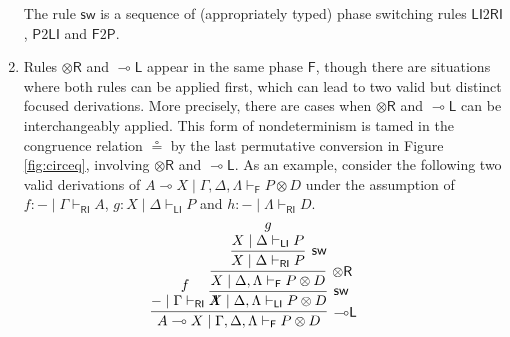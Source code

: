 \documentclass[submission,copyright,creativecommons]{eptcs}
\theoremstyle{definition}
\newcommand{\tr}{\otimes \mathsf{R}}
\newcommand{\lleft}{{\multimap}\mathsf{L}}
\newcommand{\ot}{\otimes}
\newcommand{\lolli}{\multimap}
\newcommand{\RI}{\mathsf{RI}}
\newcommand{\LI}{\mathsf{LI}}
\newcommand{\Pass}{\mathsf{P}}
\newcommand{\F}{\mathsf{F}}
\newcommand{\proofbox}[1]{\begin{tabular}{l} #1 \end{tabular}}
\begin{document}
\begin{enumerate}
\begin{equation}
{{{      }
    }
    }
  \end{equation}
  The rule $\mathsf{sw}$ is a sequence of (appropriately typed) phase
  switching rules $\LI2\RI$, $\Pass2\LI$ and $\F2\Pass$.
  \item Rules $\tr$ and $\lleft$ appear in the same phase $\F$, though there are situations where both rules can be applied first, which can lead to two valid but distinct focused derivations. More precisely, there are cases when $\tr$ and $\lleft$ can be interchangeably applied. This form of nondeterminism is tamed in the congruence relation $\circeq$ by the last permutative conversion in Figure \ref{fig:circeq}, involving $\tr$ and $\lleft$. As an example, consider the following two valid derivations of $A \lolli X \mid \Gamma , \Delta , \Lambda \vdash_{\F} P \ot D$ under the assumption of $f : - \mid \Gamma \vdash_{\RI} A$, $g : X \mid \Delta \vdash_{\LI} P$ and $h : - \mid \Lambda \vdash_{\RI} D$.
    \begin{equation}\label{eq:llefttr}
      \hspace{-.5cm}
      \proofbox{
      \infer[\lleft]{A \lolli X \mid \Gamma , \Delta , \Lambda \vdash_{\F} P \ot D}{
        \deduce{- \mid \Gamma \vdash_{\RI} A}{f}
        &\hspace{-.6cm}
        \infer[\mathsf{sw}]{X \mid \Delta , \Lambda \vdash_{\LI} P \ot D}{
          \infer[\tr]{X \mid \Delta , \Lambda \vdash_{\F} P\ot D}{
            \infer[\mathsf{sw}]{X \mid \Delta \vdash_{\RI} P}{
              \deduce{X \mid \Delta \vdash_{\LI} P}{g}
            }
}}}}
\end{equation}
\end{enumerate}
\end{document}
